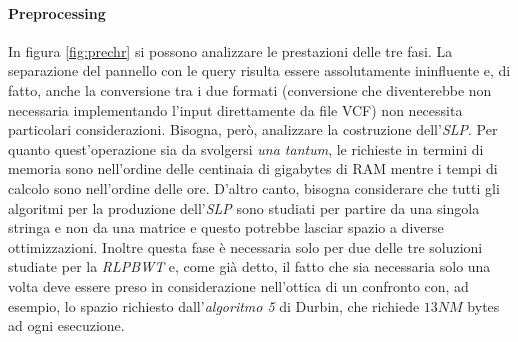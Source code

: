 \paragraph{Preprocessing}
In figura \ref{fig:prechr} si possono analizzare le prestazioni delle tre
fasi. La separazione del pannello con le query risulta essere assolutamente
ininfluente e, di fatto, anche la conversione tra i due formati (conversione che
diventerebbe non necessaria implementando l'input direttamente da file VCF) non
necessita particolari considerazioni. Bisogna, però, analizzare la costruzione
dell'\textit{SLP}. Per quanto quest'operazione sia da svolgersi \textit{una
  tantum}, le richieste in termini di memoria sono nell'ordine delle centinaia
di gigabytes di RAM mentre i tempi di calcolo sono nell'ordine delle
ore. D'altro canto, bisogna considerare che tutti gli algoritmi per la produzione
dell'\textit{SLP} sono studiati per partire da una singola stringa e non da una
matrice e questo potrebbe lasciar spazio a diverse ottimizzazioni. Inoltre
questa fase è necessaria solo per due delle tre soluzioni studiate per la
\textit{RLPBWT} e, come già detto, il fatto che sia necessaria solo una volta
deve essere preso in considerazione nell'ottica di un confronto con, ad esempio,
lo spazio richiesto dall'\textit{algoritmo 5} di Durbin, che richiede $13NM$
bytes ad ogni esecuzione.
